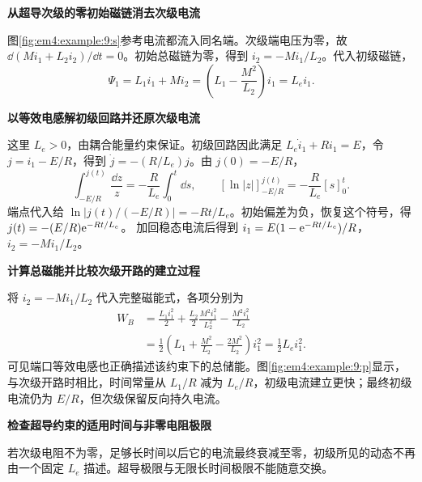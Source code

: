 \begin{solution}\textbf{从超导次级的零初始磁链消去次级电流}\par\nobreak
图\ref{fig:em4:example:9:s}参考电流都流入同名端。次级端电压为零，故 $\dd(Mi_1+L_2i_2)/\dd t=0$。初始总磁链为零，得到 $i_2=-Mi_1/L_2$。代入初级磁链，
\[\Psi_1=L_1i_1+Mi_2=\left(L_1-\frac{M^2}{L_2}\right)i_1=L_ei_1.\]


\par\medskip{}\noindent\textbf{以等效电感解初级回路并还原次级电流}\par\nobreak
这里 $L_e>0$，由耦合能量约束保证。初级回路因此满足 $L_e\dot i_1+Ri_1=E$，令 $j=i_1-E/R$，得到 $\dot j=-(R/L_e)j$。由 $j(0)=-E/R$，
\[
\int_{-E/R}^{j(t)}\frac{\dd z}{z}=-\frac R{L_e}\int_0^t\dd s,
 \qquad [\ln|z|]_{-E/R}^{j(t)}=-\frac R{L_e}[s]_0^t.
\]
端点代入给 $\ln|j(t)/(-E/R)|=-Rt/L_e$。初始偏差为负，恢复这个符号，得 $j(t)=-(E/R)\mathrm e^{-Rt/L_e}$。
加回稳态电流后得到 $i_1=E(1-\mathrm e^{-Rt/L_e})/R$，$i_2=-Mi_1/L_2$。



\par\medskip{}\noindent\textbf{计算总磁能并比较次级开路的建立过程}\par\nobreak
将 $i_2=-Mi_1/L_2$ 代入完整磁能式，各项分别为
\[
 \begin{aligned}
 W_B&=\frac{L_1i_1^2}{2}
 +\frac{L_2}{2}\frac{M^2i_1^2}{L_2^2}
 -\frac{M^2i_1^2}{L_2}\\
 &=\frac12\left(L_1+\frac{M^2}{L_2}-\frac{2M^2}{L_2}\right)i_1^2
 =\frac12L_ei_1^2.
 \end{aligned}
\]
可见端口等效电感也正确描述该约束下的总储能。图\ref{fig:em4:example:9:p}显示，与次级开路时相比，时间常量从 $L_1/R$ 减为 $L_e/R$，初级电流建立更快；最终初级电流仍为 $E/R$，但次级保留反向持久电流。



\par\medskip{}\noindent\textbf{检查超导约束的适用时间与非零电阻极限}\par\nobreak
若次级电阻不为零，足够长时间以后它的电流最终衰减至零，初级所见的动态不再由一个固定 $L_e$ 描述。超导极限与无限长时间极限不能随意交换。\end{solution}
